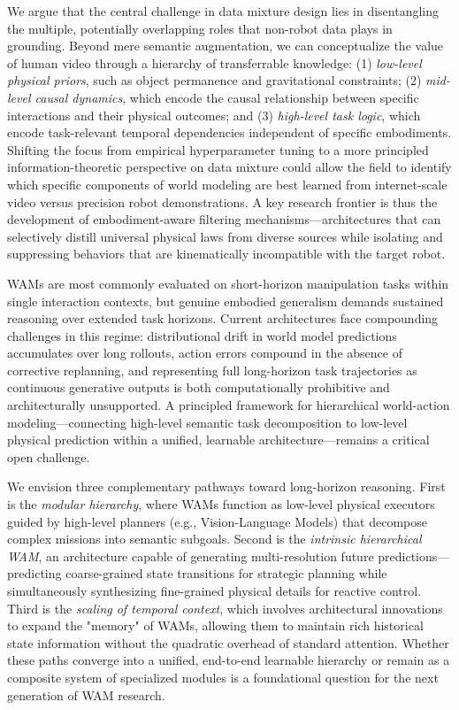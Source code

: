 We argue that the central challenge in data mixture design lies in disentangling the multiple, potentially overlapping roles that non-robot data plays in grounding. Beyond mere semantic augmentation, we can conceptualize the value of human video through a hierarchy of transferrable knowledge: (1) \textit{low-level physical priors}, such as object permanence and gravitational constraints; (2) \textit{mid-level causal dynamics}, which encode the causal relationship between specific interactions and their physical outcomes; and (3) \textit{high-level task logic}, which encode task-relevant temporal dependencies independent of specific embodiments. Shifting the focus from empirical hyperparameter tuning to a more principled information-theoretic perspective on data mixture could allow the field to identify which specific components of world modeling are best learned from internet-scale video versus precision robot demonstrations. A key research frontier is thus the development of embodiment-aware filtering mechanisms—architectures that can selectively distill universal physical laws from diverse sources while isolating and suppressing behaviors that are kinematically incompatible with the target robot.



WAMs are most commonly evaluated on short-horizon manipulation tasks within single interaction contexts, but genuine embodied generalism demands sustained reasoning over extended task horizons. Current architectures face compounding challenges in this regime: distributional drift in world model predictions accumulates over long rollouts, action errors compound in the absence of corrective replanning, and representing full long-horizon task trajectories as continuous generative outputs is both computationally prohibitive and architecturally unsupported. A principled framework for hierarchical world-action modeling---connecting high-level semantic task decomposition to low-level physical prediction within a unified, learnable architecture---remains a critical open challenge.


We envision three complementary pathways toward long-horizon reasoning. First is the \textit{modular hierarchy}, where WAMs function as low-level physical executors guided by high-level planners (e.g., Vision-Language Models) that decompose complex missions into semantic subgoals. Second is the \textit{intrinsic hierarchical WAM}, an architecture capable of generating multi-resolution future predictions—predicting coarse-grained state transitions for strategic planning while simultaneously synthesizing fine-grained physical details for reactive control. Third is the \textit{scaling of temporal context}, which involves architectural innovations to expand the "memory" of WAMs, allowing them to maintain rich historical state information without the quadratic overhead of standard attention. Whether these paths converge into a unified, end-to-end learnable hierarchy or remain as a composite system of specialized modules is a foundational question for the next generation of WAM research.


